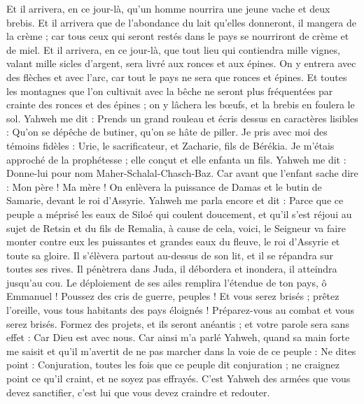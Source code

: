 \begin{multicols}{2}
Et il arrivera, en ce jour-là, qu'un homme nourrira une jeune vache et deux brebis.
Et il arrivera que de l'abondance du lait qu'elles donneront, il mangera de la crème ; car tous ceux qui seront restés dans le pays se nourriront de crème et de miel.
Et il arrivera, en ce jour-là, que tout lieu qui contiendra mille vignes, valant mille sicles d'argent, sera livré aux ronces et aux épines.
On y entrera avec des flèches et avec l'arc, car tout le pays ne sera que ronces et épines.
Et toutes les montagnes que l'on cultivait avec la bêche ne seront plus fréquentées par crainte des ronces et des épines ; on y lâchera les bœufs, et la brebis en foulera le sol.
\VerseOne{}Yahweh me dit : Prends un grand rouleau et écris dessus en caractères lisibles : Qu'on se dépêche de butiner, qu'on se hâte de piller.
Je pris avec moi des témoins fidèles : Urie, le sacrificateur, et Zacharie, fils de Bérékia.
Je m'étais approché de la prophétesse ; elle conçut et elle enfanta un fils. Yahweh me dit : Donne-lui pour nom Maher-Schalal-Chasch-Baz.
Car avant que l'enfant sache dire : Mon père ! Ma mère ! On enlèvera la puissance de Damas et le butin de Samarie, devant le roi d'Assyrie.
Yahweh me parla encore et dit :
Parce que ce peuple a méprisé les eaux de Siloé qui coulent doucement, et qu'il s'est réjoui au sujet de Retsin et du fils de Remalia,
à cause de cela, voici, le Seigneur va faire monter contre eux les puissantes et grandes eaux du fleuve, le roi d'Assyrie et toute sa gloire. Il s'élèvera partout au-dessus de son lit, et il se répandra sur toutes ses rives.
Il pénètrera dans Juda, il débordera et inondera, il atteindra jusqu'au cou. Le déploiement de ses ailes remplira l'étendue de ton pays, ô Emmanuel !
Poussez des cris de guerre, peuples ! Et vous serez brisés ; prêtez l'oreille, vous tous habitants des pays éloignés ! Préparez-vous au combat et vous serez brisés.
Formez des projets, et ils seront anéantis ; et votre parole sera sans effet : Car Dieu est avec nous.
Car ainsi m'a parlé Yahweh, quand sa main forte me saisit et qu'il m'avertit de ne pas marcher dans la voie de ce peuple :
Ne dites point : Conjuration, toutes les fois que ce peuple dit conjuration ; ne craignez point ce qu'il craint, et ne soyez pas effrayés.
C'est Yahweh des armées que vous devez sanctifier, c'est lui que vous devez craindre et redouter.

\end{multicols}
